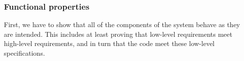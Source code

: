 \documentclass{template/openetcs_article}
\begin{document}








\subsubsection{Functional properties}

First, we have to show that all of the components of the system behave
as they are intended. This includes at least proving that low-level requirements meet
high-level requirements, and in turn that the code meet these low-level
specifications. 
\end{document}
